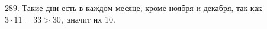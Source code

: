 289. Такие дни есть в каждом месяце, кроме ноября и декабря, так как $3\cdot11=33>30,$ значит их 10.\\

